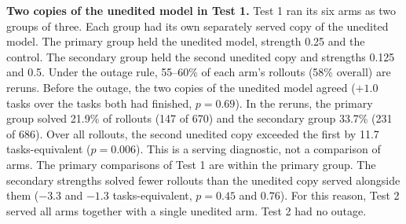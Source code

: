 \textbf{Two copies of the unedited model in Test 1.} Test 1 ran its six arms as two groups of three. Each group had its own separately served copy of the unedited model. The primary group held the unedited model, strength 0.25 and the control. The secondary group held the second unedited copy and strengths 0.125 and 0.5. Under the outage rule, 55--60\% of each arm's rollouts (58\% overall) are reruns. Before the outage, the two copies of the unedited model agreed ($+1.0$ tasks over the tasks both had finished, $p = 0.69$). In the reruns, the primary group solved 21.9\% of rollouts (147 of 670) and the secondary group 33.7\% (231 of 686). Over all rollouts, the second unedited copy exceeded the first by 11.7 tasks-equivalent ($p = 0.006$). This is a serving diagnostic, not a comparison of arms. The primary comparisons of Test 1 are within the primary group. The secondary strengths solved fewer rollouts than the unedited copy served alongside them ($-3.3$ and $-1.3$ tasks-equivalent, $p = 0.45$ and $0.76$). For this reason, Test 2 served all arms together with a single unedited arm. Test 2 had no outage.
